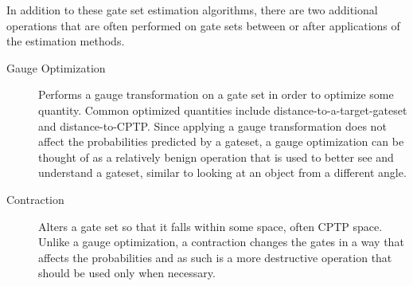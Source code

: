 \documentclass{article}[11pt]
\begin{document}
In addition to these gate set estimation algorithms, there are two additional operations that are often performed on gate sets between or after applications of the estimation methods.
\begin{description}
\item[Gauge Optimization] Performs a gauge transformation on a gate set in order to optimize some quantity.  Common optimized quantities include distance-to-a-target-gateset and distance-to-CPTP.  Since applying a gauge transformation does not affect the probabilities predicted by a gateset, a gauge optimization can be thought of as a relatively benign operation that is used to better see and understand a gateset, similar to looking at an object from a different angle.
\item[Contraction] Alters a gate set so that it falls within some space, often CPTP space.  Unlike a gauge optimization, a contraction changes the gates in a way that affects the probabilities and as such is a more destructive operation that should be used only when necessary.
\end{description}
\end{document}
